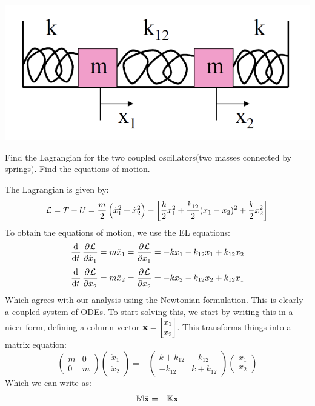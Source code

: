 \begin{center}
    \includegraphics[scale=0.5]{Lecture-10/w10-img1.png}
\end{center}
\begin{p}
Find the Lagrangian for the two coupled oscillators(two masses connected by springs). Find the equations of motion.
\end{p}
\begin{s}
The Lagrangian is given by:
\[\mathcal{L} = T - U = \frac{m}{2}\left(\dot{x}^2_1 + \dot{x}^2_2\right) - \left[\frac{k}{2}x_1^2 + \frac{k_{12}}{2}(x_1 - x_2)^2 + \frac{k}{2}x_2^2\right]\]
To obtain the equations of motion, we use the EL equations:
\[\dod{}{t}\dpd{\LL}{\dot{x}_1} = m\ddot{x}_1 = \dpd{\LL}{x_1} = -kx_1 - k_{12}x_1 + k_{12}x_2\]
\[\dod{}{t}\dpd{\LL}{\dot{x}_2} = m\ddot{x}_2 = \dpd{\LL}{x_2} = -kx_2 - k_{12}x_2 + k_{12}x_1\]
Which agrees with our analysis using the Newtonian formulation. This is clearly a coupled system of ODEs. To start solving this, we start by writing this in a nicer form, defining a column vector $\mathbf{x} = \begin{bmatrix}x_1 \\ x_2\end{bmatrix}$. This transforms things into a matrix equation:
$$\left(\begin{array}{cc}m & 0 \\ 0 & m\end{array}\right)\left(\begin{array}{c}\ddot{x}_{1} \\ \ddot{x}_{2}\end{array}\right)=-\left(\begin{array}{cc}k+k_{12} & -k_{12} \\ -k_{12} & k+k_{12}\end{array}\right)\left(\begin{array}{c}x_{1} \\ x_{2}\end{array}\right)$$
Which we can write as:
\[\mathbb{M}\ddot{\mathbf{x}} = -\mathbb{K}\mathbf{x}\]
\end{s}

